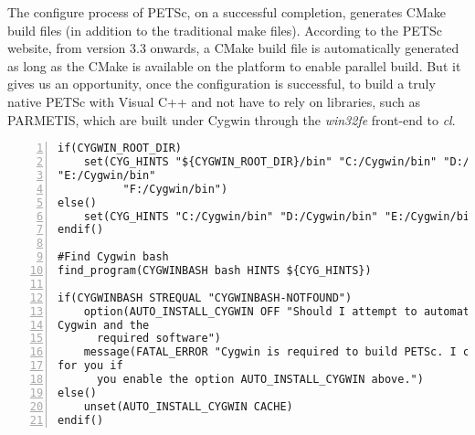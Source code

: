 \documentclass[10pt,a4paper]{article}
\begin{document}
The configure process of PETSc, on a successful completion, generates CMake
build files
(in addition to the traditional make files). According to the PETSc website, 
from version 3.3 onwards, a CMake build file is automatically generated as long
as the CMake is available on the platform to enable parallel build. But it gives
us an opportunity, once the configuration is successful, to build a truly native
PETSc with Visual C++ and not have to rely on libraries, such as PARMETIS, which
are built under Cygwin through the \textit{win32fe} front-end to \textit{cl}. 


\newpage

\begin{codeparchment}
\begin{lstlisting}[numbers=left]
if(CYGWIN_ROOT_DIR)
	set(CYG_HINTS "${CYGWIN_ROOT_DIR}/bin" "C:/Cygwin/bin" "D:/Cygwin/bin"
"E:/Cygwin/bin" 
	      "F:/Cygwin/bin")
else()
	set(CYG_HINTS "C:/Cygwin/bin" "D:/Cygwin/bin" "E:/Cygwin/bin" "F:/Cygwin/bin")
endif()

#Find Cygwin bash
find_program(CYGWINBASH bash HINTS ${CYG_HINTS})

if(CYGWINBASH STREQUAL "CYGWINBASH-NOTFOUND")
	option(AUTO_INSTALL_CYGWIN OFF "Should I attempt to automatically install
Cygwin and the 
	  required software")
	message(FATAL_ERROR "Cygwin is required to build PETSc. I can auto-install it
for you if 
	  you enable the option AUTO_INSTALL_CYGWIN above.")
else()
	unset(AUTO_INSTALL_CYGWIN CACHE)	
endif()
\end{lstlisting}
\end{codeparchment}
\end{document}
